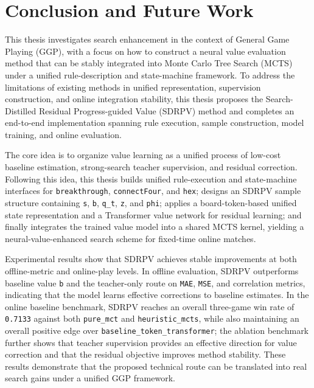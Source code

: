 ﻿%
\chapter{Conclusion and Future Work}
\setcounter{figure}{0}
\setcounter{equation}{0}
\renewcommand{\thefigure}{\thechapter-\arabic{figure}}
\renewcommand{\theequation}{\thechapter-\arabic{equation}}

This thesis investigates search enhancement in the context of General Game Playing (GGP), with a focus on how to construct a neural value evaluation method that can be stably integrated into Monte Carlo Tree Search (MCTS) under a unified rule-description and state-machine framework. To address the limitations of existing methods in unified representation, supervision construction, and online integration stability, this thesis proposes the Search-Distilled Residual Progress-guided Value (SDRPV) method and completes an end-to-end implementation spanning rule execution, sample construction, model training, and online evaluation.

The core idea is to organize value learning as a unified process of low-cost baseline estimation, strong-search teacher supervision, and residual correction. Following this idea, this thesis builds unified rule-execution and state-machine interfaces for \texttt{breakthrough}, \texttt{connectFour}, and \texttt{hex}; designs an SDRPV sample structure containing \texttt{s}, \texttt{b}, \texttt{q_t}, \texttt{z}, and \texttt{phi}; applies a board-token-based unified state representation and a Transformer value network for residual learning; and finally integrates the trained value model into a shared MCTS kernel, yielding a neural-value-enhanced search scheme for fixed-time online matches.

Experimental results show that SDRPV achieves stable improvements at both offline-metric and online-play levels. In offline evaluation, SDRPV outperforms baseline value \texttt{b} and the teacher-only route on \texttt{MAE}, \texttt{MSE}, and correlation metrics, indicating that the model learns effective corrections to baseline estimates. In the online baseline benchmark, SDRPV reaches an overall three-game win rate of \texttt{0.7133} against both \texttt{pure_mct} and \texttt{heuristic_mcts}, while also maintaining an overall positive edge over \texttt{baseline_token_transformer}; the ablation benchmark further shows that teacher supervision provides an effective direction for value correction and that the residual objective improves method stability. These results demonstrate that the proposed technical route can be translated into real search gains under a unified GGP framework.

